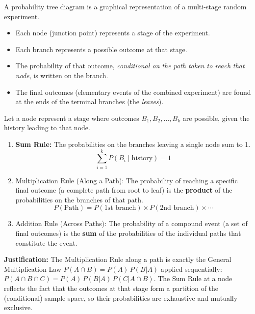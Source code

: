 \documentclass[11pt]{article}
\newcommand{\cle}[1]{{\popxbold\color{popdark}#1}}
\begin{document}
\begin{definition}
A \cle{probability tree diagram} is a graphical representation of a multi-stage random experiment.
\begin{itemize}
    \item Each \cle{node} (junction point) represents a stage of the experiment.
    \item Each \cle{branch} represents a possible outcome at that stage.
    \item The \cle{probability} of that outcome, \emph{conditional on the path taken to reach that node}, is written on the branch.
    \item The \cle{final outcomes} (elementary events of the combined experiment) are found at the ends of the terminal branches (the \emph{leaves}).
\end{itemize}
\end{definition}

\begin{propriete}
Let a node represent a stage where outcomes $B_1, B_2, \dots, B_k$ are possible, given the history leading to that node.
\begin{enumerate}
    \item \textbf{Sum Rule:} The probabilities on the branches leaving a single node sum to 1.
    \[ \sum_{i=1}^k P(B_i \mid \text{history}) = 1 \]
    \item \cle{Multiplication Rule (Along a Path):} The probability of reaching a specific final outcome (a complete path from root to leaf) is the \textbf{product} of the probabilities on the branches of that path.
    \[ P(\text{Path}) = P(\text{1st branch}) \times P(\text{2nd branch}) \times \cdots \]
    \item \cle{Addition Rule (Across Paths):} The probability of a compound event (a set of final outcomes) is the \textbf{sum} of the probabilities of the individual paths that constitute the event.
\end{enumerate}
\textbf{Justification:} The Multiplication Rule along a path is exactly the General Multiplication Law $P(A \cap B) = P(A)\,P(B|A)$ applied sequentially: $P(A \cap B \cap C) = P(A)\,P(B|A)\,P(C|A \cap B)$. The Sum Rule at a node reflects the fact that the outcomes at that stage form a partition of the (conditional) sample space, so their probabilities are exhaustive and mutually exclusive.
\end{propriete}
\end{document}
